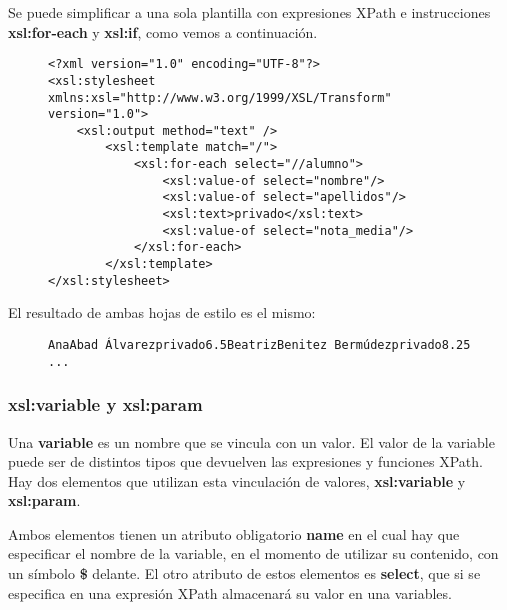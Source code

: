 Se puede simplificar a una sola plantilla con expresiones XPath e instrucciones \textbf{xsl:for-each} y \textbf{xsl:if}, como vemos a continuación.

\begin{figure}[H]
    \begin{tcolorbox}[sharp corners, colback=yellow!30, colframe=white!20]
        \scriptsize
\begin{verbatim}
<?xml version="1.0" encoding="UTF-8"?>
<xsl:stylesheet xmlns:xsl="http://www.w3.org/1999/XSL/Transform" version="1.0">
    <xsl:output method="text" />
        <xsl:template match="/">
            <xsl:for-each select="//alumno">
                <xsl:value-of select="nombre"/>
                <xsl:value-of select="apellidos"/>
                <xsl:text>privado</xsl:text>
                <xsl:value-of select="nota_media"/>
            </xsl:for-each>
        </xsl:template>
</xsl:stylesheet>
\end{verbatim}
\end{tcolorbox}
\end{figure}

El resultado de ambas hojas de estilo es el mismo:

\begin{figure}[H]
    \begin{tcolorbox}[sharp corners, colback=yellow!30, colframe=white!20]
        \scriptsize
\begin{verbatim}
AnaAbad Álvarezprivado6.5BeatrizBenitez Bermúdezprivado8.25 ...
\end{verbatim}
    \end{tcolorbox}
\end{figure}

\subsubsection{xsl:variable y xsl:param}
Una \textbf{variable} es un nombre que se vincula con un valor. El valor de la variable puede ser de distintos tipos que devuelven las expresiones y funciones XPath. Hay dos elementos que utilizan esta vinculación de valores, \textbf{xsl:variable} y \textbf{xsl:param}.

Ambos elementos tienen un atributo obligatorio \textbf{name} en el cual hay que especificar el nombre de la variable, en el momento de utilizar su contenido, con un símbolo \textbf{\$} delante.  El otro atributo de estos elementos es \textbf{select}, que si se especifica en una expresión XPath almacenará su valor en una variables.


